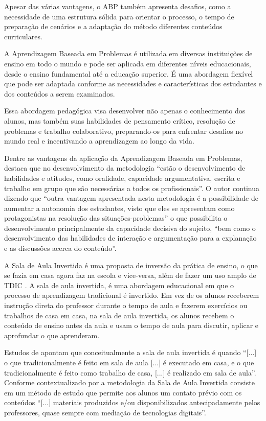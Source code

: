 Apesar das várias vantagens, o ABP também apresenta desafios, como a necessidade de uma estrutura sólida para orientar o processo, o tempo de preparação de cenários e a adaptação do método diferentes conteúdos curriculares.

A Aprendizagem Baseada em Problemas é utilizada em diversas instituições de ensino em todo o mundo e pode ser aplicada em diferentes níveis educacionais, desde o ensino fundamental até a educação superior. É uma abordagem flexível que pode ser adaptada conforme as necessidades e características dos estudantes e dos conteúdos a serem examinados.

Essa abordagem pedagógica visa desenvolver não apenas o conhecimento dos alunos, mas também suas habilidades de pensamento crítico, resolução de problemas e trabalho colaborativo, preparando-os para enfrentar desafios no mundo real e incentivando a aprendizagem ao longo da vida.

Dentre as vantagens da aplicação da Aprendizagem Baseada em Problemas,  destaca que no desenvolvimento da metodologia ``estão o desenvolvimento de habilidades e atitudes, como oralidade, capacidade argumentativa, escrita e trabalho em grupo que são necessárias a todos os profissionais''. O autor continua dizendo que ``outra vantagem apresentada nesta metodologia é a possibilidade de aumentar a autonomia dos estudantes, visto que eles se apresentam como protagonistas na resolução das situações-problemas'' o que possibilita o desenvolvimento principalmente da capacidade decisiva do sujeito, ``bem como o desenvolvimento das habilidades de interação e argumentação para a explanação e as discussões acerca do conteúdo''.

A Sala de Aula Invertida é uma proposta de inversão da prática de ensino, o que se fazia em casa agora faz na escola e vice-versa, além de fazer um uso amplo de TDIC \cite{BERGMANNSANS2016}. A sala de aula invertida, é uma abordagem educacional em que o processo de aprendizagem tradicional é invertido. Em vez de os alunos receberem instrução direta do professor durante o tempo de aula e fazerem exercícios ou trabalhos de casa em casa, na sala de aula invertida, os alunos recebem o conteúdo de ensino antes da aula e usam o tempo de aula para discutir, aplicar e aprofundar o que aprenderam.

Estudos de  apontam que conceitualmente a sala de aula invertida é quando ``[...] o que tradicionalmente é feito em sala de aula [...] é executado em casa, e o que tradicionalmente é feito como trabalho de casa, [...] é realizado em sala de aula''. Conforme contextualizado por  a metodologia da Sala de Aula Invertida consiste em um método de estudo que permite aos alunos um contato prévio com os conteúdos ``[...] materiais produzidos e/ou disponibilizados antecipadamente pelos professores, quase sempre com mediação de tecnologias digitais''.

